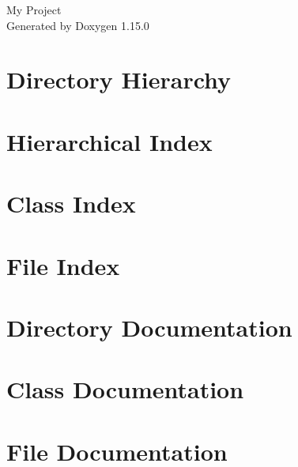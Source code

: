 \documentclass[twoside]{book}
\newcommand{\+}{\discretionary{\mbox{\scriptsize$\hookleftarrow$}}{}{}}
\newcommand{\clearemptydoublepage}{%
    \newpage{\pagestyle{empty}\cleardoublepage}%
  }
\begin{document}
  \raggedbottom
    \hypersetup{pageanchor=false,
                bookmarksnumbered=true,
                pdfencoding=unicode
               }
  \begin{titlepage}
  \vspace*{7cm}
  \begin{center}%
  {\Large My Project}\\
  \vspace*{1cm}
  {\large Generated by Doxygen 1.15.0}\\
  \end{center}
  \end{titlepage}
  \clearemptydoublepage
  \tableofcontents
  \clearemptydoublepage
  \hypersetup{pageanchor=true}


\chapter{Directory Hierarchy}

\chapter{Hierarchical Index}

\chapter{Class Index}

\chapter{File Index}

\chapter{Directory Documentation}



\chapter{Class Documentation}







\chapter{File Documentation}









  \backmatter
  \newpage
  \clearemptydoublepage
  \printindex
\end{document}
